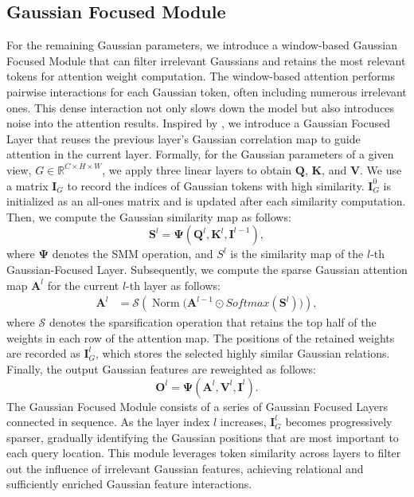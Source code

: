 \subsection{Gaussian Focused Module}
\label{GFM}
For the remaining Gaussian parameters, we introduce a window-based Gaussian Focused Module that can filter irrelevant Gaussians and retains the most relevant tokens for attention weight computation.
%
The window-based attention performs pairwise interactions for each Gaussian token, often including numerous irrelevant ones.
%
This dense interaction not only slows down the model but also introduces noise into the attention results.
%
Inspired by \cite{long2025progressive}, we introduce a Gaussian Focused Layer that reuses the previous layer's Gaussian correlation map to guide attention in the current layer.
%
Formally, for the Gaussian parameters of a given view, $G \in \mathbb{R}^{C \times H \times W}$, we apply three linear layers to obtain $\mathbf{Q}$, $\mathbf{K}$, and $\mathbf{V}$.
We use a matrix $\mathbf{I}_{G}$ to record the indices of Gaussian tokens with high similarity.
%
$\mathbf{I}_{G}^{0}$ is initialized as an all-ones matrix and is updated after each similarity computation.
%
Then, we compute the Gaussian similarity map as follows:
%
%
\begin{equation} 
    \label{eq:sparse_sa_calculation}
    \mathbf{S}^{l} = \mathbf{\Psi} (\mathbf{Q}^{l}, \mathbf{K}^{l}, \mathbf{I}^{l-1}),
\end{equation}
%
%
where $\mathbf{\Psi}$ denotes the SMM operation, and $S^{l}$ is the similarity map of the $l$-th Gaussian-Focused Layer.
%
Subsequently, we compute the sparse Gaussian attention map $\mathbf{A}^{l}$ for the current $l$-th layer as follows:
%
%
\begin{align}
\label{eq:pfa_b}
    \mathbf{A}^{l} &= \mathcal{S}\!\left(\operatorname{Norm} \big( \mathbf{A}^{l-1} \odot Softmax(\mathbf{S}^{l})  \big)\right),
\end{align}
%
%
where $\mathcal{S}$ denotes the sparsification operation that retains the top half of the weights in each row of the attention map. The positions of the retained weights are recorded as $\mathbf{I}_{G}^{l}$, which stores the selected highly similar Gaussian relations.
%
Finally, the output Gaussian features are reweighted as follows:
%
%
\begin{equation}
\label{eq:attn_v}
    \mathbf{O}^{l} = \mathbf{\Psi}(\mathbf{A}^{l}, \mathbf{V}^{l}, \mathbf{I}^{l}).
\end{equation}
%
%
The Gaussian Focused Module consists of a series of Gaussian Focused Layers connected in sequence.
%
As the layer index $l$ increases, $\mathbf{I}_{G}^{l}$ becomes progressively sparser, gradually identifying the Gaussian positions that are most important to each query location.
%
This module leverages token similarity across layers to filter out the influence of irrelevant Gaussian features, achieving relational and sufficiently enriched Gaussian feature interactions.






